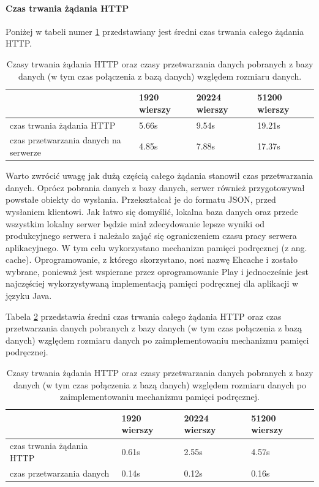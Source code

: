 \documentclass[a4paper,12pt,twoside]{article}
\begin{document}
\paragraph{Czas trwania żądania HTTP}
Poniżej w tabeli numer \ref{table:httpRequestTime} przedstawiany jest średni czas trwania całego żądania HTTP.
\begin{table}[H]
\begin{tabular}{| p{3cm} | p{3cm} | p{3cm} | p{3cm}|}
\hline
& 1920 wierszy & 20224 wierszy & 51200 wierszy\\
\hline
czas trwania żądania HTTP& 5.66s & 9.54s & 19.21s \\ \hline
czas przetwarzania danych na serwerze& 4.85s& 7.88s& 17.37s\\ \hline
\end{tabular}
\caption{Czasy trwania żądania HTTP oraz czasy przetwarzania danych pobranych z bazy danych (w tym czas połączenia z bazą danych) względem rozmiaru danych. }
\label{table:httpRequestTime}
\end{table}
Warto zwrócić uwagę jak dużą częścią całego żądania stanowił czas przetwarzania danych. Oprócz pobrania danych z bazy danych, serwer również przygotowywał
powstałe obiekty do wysłania. Przekształcał je do formatu JSON, przed wysłaniem
klientowi.
Jak łatwo się domyślić, lokalna baza danych oraz przede wszystkim lokalny serwer będzie miał zdecydowanie lepsze wyniki od produkcyjnego serwera i należało
zająć się ograniczeniem czasu pracy serwera aplikacyjnego.
W tym celu wykorzystano mechanizm pamięci podręcznej (z ang. cache).
Oprogramowanie, z którego skorzystano, nosi nazwę Ehcache \cite{cache} i
zostało wybrane, ponieważ jest wspierane przez oprogramowanie Play
i jednocześnie jest najczęściej wykorzystywaną implementacją pamięci podręcznej
dla aplikacji w języku Java.

Tabela \ref{table:httpRequestTimeCache} przedstawia średni czas trwania
całego żądania HTTP oraz czas przetwarzania danych pobranych z bazy danych
(w tym czas połączenia z bazą danych) względem rozmiaru danych po zaimplementowaniu
mechanizmu pamięci podręcznej.
\begin{table} [H]
\begin{tabular}{| p{3cm} | p{3cm} | p{3cm} | p{3cm}|}
\hline
& 1920 wierszy & 20224 wierszy & 51200 wierszy\\
\hline
czas trwania żądania HTTP& 0.61s & 2.55s& 4.57s \\ \hline
czas przetwarzania danych& 0.14s& 0.12s& 0.16s\\ \hline
\end{tabular}
\caption{Czasy trwania żądania HTTP oraz czasy przetwarzania danych pobranych z bazy danych (w tym czas połączenia z bazą danych) względem rozmiaru danych po zaimplementowaniu mechanizmu pamięci podręcznej.}
\label{table:httpRequestTimeCache}
\end{table}
\end{document}
